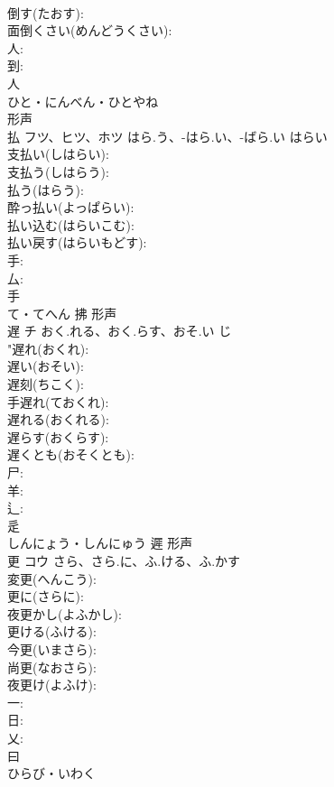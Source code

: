 \documentclass[8pt]{extreport}
\begin{document}
\begin{CJK}{UTF8}{min}
\\	倒す(たおす): 
\\	面倒くさい(めんどうくさい): 
\\	人: 
\\	到: 
\\	人	
\\	ひと・にんべん・ひとやね	
\\	形声 
\\	払	フツ、ヒツ、ホツ	はら.う、-はら.い、-ばら.い	はらい	
\\	支払い(しはらい): 
\\	支払う(しはらう): 
\\	払う(はらう): 
\\	酔っ払い(よっぱらい): 
\\	払い込む(はらいこむ): 
\\	払い戻す(はらいもどす): 
\\	手: 
\\	厶: 
\\	手	
\\	て・てへん	拂	形声 
\\	遅	チ	おく.れる、おく.らす、おそ.い	じ	
\\	"遅れ(おくれ): 
\\	遅い(おそい): 
\\	遅刻(ちこく): 
\\	手遅れ(ておくれ): 
\\	遅れる(おくれる): 
\\	遅らす(おくらす): 
\\	遅くとも(おそくとも): 
\\	尸: 
\\	羊: 
\\	辶: 
\\	辵	
\\	しんにょう・しんにゅう	遲	形声 
\\	更	コウ	さら、さら.に、ふ.ける、ふ.かす		
\\	変更(へんこう): 
\\	更に(さらに): 
\\	夜更かし(よふかし): 
\\	更ける(ふける): 
\\	今更(いまさら): 
\\	尚更(なおさら): 
\\	夜更け(よふけ): 
\\	一: 
\\	日: 
\\	乂: 
\\	曰	
\\	ひらび・いわく	

\end{CJK}
\end{document}
